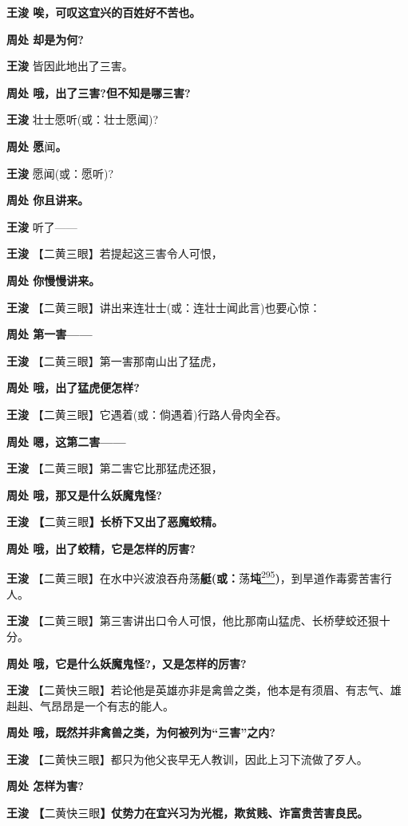 \textbf{王浚 唉，可叹这宜兴的百姓好不苦也。}

\textbf{周处 却是为何?}

\textbf{王浚} 皆因此地出了三害。

\textbf{周处 哦，出了三害?但不知是哪三害?}

\textbf{王浚} 壮士愿听(或：壮士愿闻)?

\textbf{周处 愿}闻\textbf{。}

\textbf{王浚} 愿闻(或：愿听)?

\textbf{周处 你且讲来。}

\textbf{王浚} 听了------

\textbf{王浚} 【二黄三眼】若提起这三害令人可恨，

\textbf{周处 你慢慢讲来。}

\textbf{王浚} 【二黄三眼】讲出来连壮士(或：连壮士闻此言)也要心惊：

\textbf{周处 第一害------}

\textbf{王浚} 【二黄三眼】第一害那南山出了猛虎，

\textbf{周处 哦，出了猛虎便怎样?}

\textbf{王浚} 【二黄三眼】它遇着(或：倘遇着)行路人骨肉全吞。

\textbf{周处 嗯，这第二害------}

\textbf{王浚} 【二黄三眼】第二害它比那猛虎还狠，

\textbf{周处 哦，那又是什么妖魔鬼怪?}

\textbf{王浚 【}二黄三眼\textbf{】长桥下又出了恶魔蛟精。}

\textbf{周处 哦，出了蛟精，它是怎样的厉害?}

\textbf{王浚}
【二黄三眼】在水中兴波浪吞舟荡\textbf{艇(或：}荡\textbf{坉}\protect\hyperlink{fn295}{\textsuperscript{295}}\textbf{)}，到旱道作毒雾苦害行人。

\textbf{王浚}
【二黄三眼】第三害讲出口令人可恨，他比那南山猛虎、长桥孽蛟还狠十分。

\textbf{周处 哦，它是什么妖魔鬼怪?，又是怎样的厉害?}

\textbf{王浚}
【二黄快三眼】若论他是英雄亦非是禽兽之类，他本是有须眉、有志气、雄赳赳、气昂昂是一个有志的能人。

\textbf{周处 哦，既然并非禽兽之类，为何被列为``三害''之内?}

\textbf{王浚}
【二黄快三眼】都只为他父丧早无人教训，因此上习下流做了歹人。

\textbf{周处 怎样为害?}

\textbf{王浚
【}二黄快三眼\textbf{】仗势力在宜兴习为光棍，欺贫贱、诈富贵苦害良民。}

